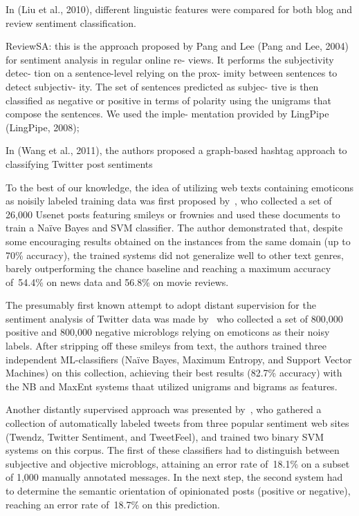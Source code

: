 In (Liu et al., 2010), different linguistic features were compared for
both blog and review sentiment classification.


ReviewSA: this is the approach proposed by Pang and Lee (Pang and Lee,
2004) for sentiment analysis in regular online re- views. It performs
the subjectivity detec- tion on a sentence-level relying on the prox-
imity between sentences to detect subjectiv- ity. The set of sentences
predicted as subjec- tive is then classified as negative or positive
in terms of polarity using the unigrams that compose the sentences. We
used the imple- mentation provided by LingPipe (LingPipe, 2008);



\todo[inline]{}


In (Wang et al., 2011), the authors
proposed a graph-based hashtag approach to classifying Twitter post
sentiments

\todo[inline]{}

To the best of our knowledge, the idea of utilizing web texts
containing emoticons as noisily labeled training data was first
proposed by~\citet{Read:05}, who collected a set of 26,000 Usenet
posts featuring smileys or frownies and used these documents to train
a Na{\"i}ve Bayes and SVM classifier.  The author demonstrated that,
despite some encouraging results obtained on the instances from the
same domain (up to 70\% accuracy), the trained systems did not
generalize well to other text genres, barely outperforming the chance
baseline and reaching a maximum accuracy of~54.4\% on news data and
56.8\% on movie reviews.

The presumably first known attempt to adopt distant supervision for
the sentiment analysis of Twitter data was made by~\citet{Go:09} who
collected a set of 800,000 positive and 800,000 negative microblogs
relying on emoticons as their noisy labels.  After stripping off these
smileys from text, the authors trained three independent
ML-classifiers (Na{\"i}ve Bayes, Maximum Entropy, and Support Vector
Machines) on this collection, achieving their best results (82.7\%
accuracy) with the NB and MaxEnt systems thaat utilized unigrams and
bigrams as features.

Another distantly supervised approach was presented
by~\citet{Barbosa:10}, who gathered a collection of automatically
labeled tweets from three popular sentiment web sites (Twendz, Twitter
Sentiment, and TweetFeel), and trained two binary SVM systems on this
corpus.  The first of these classifiers had to distinguish between
subjective and objective microblogs, attaining an error rate of~18.1\%
on a subset of 1,000 manually annotated messages.  In the next step,
the second system had to determine the semantic orientation of
opinionated posts (positive or negative), reaching an error rate
of~18.7\% on this prediction.

